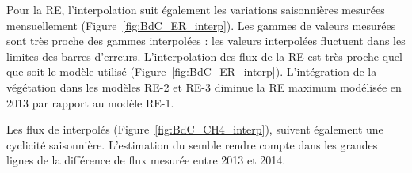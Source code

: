Pour la RE, l'interpolation suit également les variations saisonnières mesurées mensuellement (Figure~\ref{fig:BdC_ER_interp}).
Les gammes de valeurs mesurées sont très proche des gammes interpolées :
les valeurs interpolées fluctuent dans les limites des barres d'erreurs.
L'interpolation des flux de la RE est très proche quel que soit le modèle utilisé (Figure~\ref{fig:BdC_ER_interp}).
L'intégration de la végétation dans les modèles RE-2 et RE-3 diminue la RE maximum modélisée en 2013 par rapport au modèle RE-1.

Les flux de \chh interpolés (Figure~\ref{fig:BdC_CH4_interp}), suivent également une cyclicité saisonnière.
L'estimation du \chh semble rendre compte dans les grandes lignes de la différence de flux mesurée entre 2013 et 2014.





